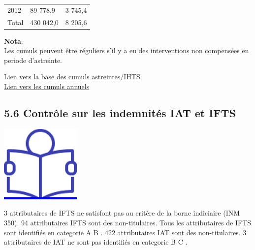 \begin{longtable}[]{@{}lll@{}}
\begin{minipage}[t]{0.07\columnwidth}\raggedright
2012\strut
\end{minipage} & \begin{minipage}[t]{0.55\columnwidth}\raggedright
89 778,9\strut
\end{minipage} & \begin{minipage}[t]{0.29\columnwidth}\raggedright
3 745,4\strut
\end{minipage}\tabularnewline
\begin{minipage}[t]{0.07\columnwidth}\raggedright
Total\strut
\end{minipage} & \begin{minipage}[t]{0.55\columnwidth}\raggedright
430 042,0\strut
\end{minipage} & \begin{minipage}[t]{0.29\columnwidth}\raggedright
8 205,6\strut
\end{minipage}\tabularnewline
\bottomrule
\end{longtable}

\textbf{Nota}:\\
Les cumuls peuvent être réguliers s'il y a eu des interventions non
compensées en periode d'astreinte.

\href{../Bases/Reglementation/Controle_astreintes_HS_irreg.csv}{Lien vers
la base des cumuls astreintes/IHTS}\\
\href{../Bases/Reglementation/Cum_astreintes_HS_irreg.csv}{Lien vers les
cumuls annuels}

\hypertarget{controle-sur-les-indemnites-iat-et-ifts}{%
\subsection{5.6 Contrôle sur les indemnités IAT et
IFTS}\label{controle-sur-les-indemnites-iat-et-ifts}}

\href{../Docs/Notices/fiche_IAT_IFTS.odt}{\includegraphics{icones/Notice.png}}

3 attributaires de IFTS ne satisfont pas au critère de la borne
indiciaire (INM 350). 94 attributaires IFTS sont des non-titulaires.
Tous les attributaires de IFTS sont identifiés en categorie A B . 422
attributaires IAT sont des non-titulaires. 3 attributaires de IAT ne
sont pas identifiés en categorie B C .

